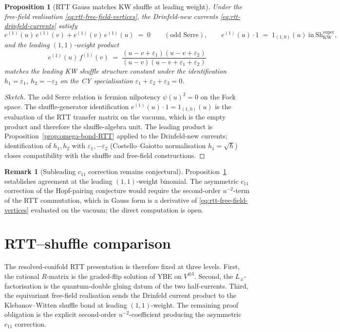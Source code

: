 \documentclass[11pt]{amsart}
\newtheorem{proposition}[theorem]{Proposition}
\theoremstyle{definition}
\newtheorem{remark}[theorem]{Remark}
\begin{document}
\begin{proposition}[RTT Gauss matches KW shuffle at leading weight]
\label{prop:gauss-to-drinfeld-kw}
Under the free-field realisation \eqref{eq:rtt-free-field-vertices}, the
Drinfeld-new currents \eqref{eq:rtt-drinfeld-currents} satisfy
\[
  e^{(1)}(u)\, e^{(1)}(v) + e^{(1)}(v)\, e^{(1)}(u) \;=\; 0
  \qquad (\text{odd Serre}),
  \qquad
  e^{(1)}(u) \cdot 1 \;=\; 1_{(1, 0)}(u)
  \ \text{in}\ \mathrm{Sh}^{\mathrm{super}}_{\mathrm{KW}},
\]
and the leading $(1, 1)$-weight product
\[
  e^{(1)}(u)\, f^{(1)}(v)
  \;=\;
  \frac{(u - v + \varepsilon_1)(u - v + \varepsilon_2)}
       {(u - v)(u - v + \varepsilon_1 + \varepsilon_2)}
\]
matches the leading KW shuffle structure constant under the identification
$h_1 = \varepsilon_1$, $h_2 = -\varepsilon_2$ on the CY specialisation
$\varepsilon_1 + \varepsilon_2 + \varepsilon_3 = 0$.
\end{proposition}

\begin{proof}[Sketch]
The odd Serre relation is fermion nilpotency $\psi(u)^2 = 0$ on the
Fock space. The shuffle-generator identification $e^{(1)}(u) \cdot 1 =
1_{(1, 0)}(u)$ is the evaluation of the RTT transfer matrix on the
vacuum, which is the empty product and therefore the shuffle-algebra
unit. The leading product is Proposition~\ref{prop:omega-bond-RTT}
applied to the Drinfeld-new currents; identification of $h_1, h_2$
with $\varepsilon_1, -\varepsilon_2$ (Costello--Gaiotto normalisation
$h_1 = \sqrt{\hbar}$) closes compatibility with the shuffle and
free-field constructions.
\end{proof}

\begin{remark}[Subleading $c_{11}$ correction remains conjectural]
\label{rem:rtt-subleading-open}
Proposition~\ref{prop:gauss-to-drinfeld-kw} establishes agreement at
the leading $(1, 1)$-weight binomial. The asymmetric $c_{11}$
correction of the Hopf-pairing conjecture would
require the second-order $u^{-2}$-term of the RTT commutation, which
in Gauss form is a derivative of \eqref{eq:rtt-free-field-vertices} evaluated
on the vacuum; the direct computation is open.
\end{remark}

\section{RTT--shuffle comparison}
\label{sec:rtt-shuffle-comparison}

The resolved-conifold RTT presentation is therefore fixed at three
levels. First, the rational \(R\)-matrix is the graded-flip solution of
YBE on \(V^{\otimes 3}\). Second, the \(L_\pm\)-factorisation is the
quantum-double gluing datum of the two half-currents. Third, the
equivariant free-field realisation sends the Drinfeld current product to
the Klebanov--Witten shuffle bond at leading \((1,1)\)-weight. The
remaining proof obligation is the explicit second-order
\(u^{-2}\)-coefficient producing the asymmetric \(c_{11}\) correction.
\end{document}

